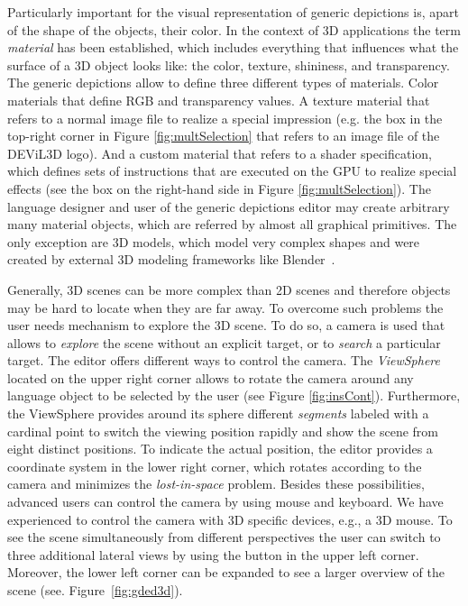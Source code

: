 \documentclass[a4paper]{article}
\newcommand{\dev}{DEViL3D\xspace}
\begin{document}
Particularly important for the visual representation of generic depictions is, apart of the shape of the objects, their color. In the context of 3D applications the term \emph{material} has been established, which includes everything that influences what the surface of a 3D object looks like: the color, texture, shininess, and transparency. The generic depictions allow to define three different types of materials. Color materials that define RGB and transparency values. A texture material that refers to a normal image file to realize a special impression (e.g. the box in the top-right corner in Figure \ref{fig:multSelection} that refers to an image file of the \dev logo). And a custom material that refers to a shader specification, which defines sets of instructions that are executed on the GPU to realize special effects (see the box on the right-hand side in Figure \ref{fig:multSelection}). The language designer and user of the generic depictions editor may create arbitrary many material objects, which are referred by almost all graphical primitives. The only exception are 3D models, which model very complex shapes and were created by external 3D modeling frameworks like Blender~\cite{Blender}.

Generally, 3D scenes can be more complex than 2D scenes and therefore objects may be hard to locate when they are far away. To overcome such problems the user needs mechanism to explore the 3D scene. To do so, a camera is used that allows to \emph{explore} the scene without an explicit target, or to \emph{search} a particular target. The editor offers different ways to control the camera. The \emph{ViewSphere} located on the upper right corner allows to rotate the camera around any language object to be selected by the user (see Figure \ref{fig:insCont}). Furthermore, the ViewSphere provides around its sphere different \emph{segments} labeled with a cardinal point to switch the viewing position rapidly and show the scene from eight distinct positions. To indicate the actual position, the editor provides a coordinate system in the lower right corner, which rotates according to the camera and minimizes the \emph{lost-in-space} problem. Besides these possibilities, advanced users can control the camera by using mouse and keyboard. We have experienced to control the camera with 3D specific devices, e.g., a 3D mouse. To see the scene simultaneously from different perspectives the user can switch to three additional lateral views by using the button in the upper left corner. Moreover, the lower left corner can be expanded to see a larger overview of the scene (see. Figure~\ref{fig:gded3d}).
\end{document}
